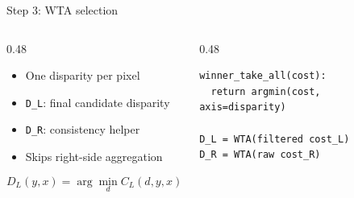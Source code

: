 \documentclass[aspectratio=169,11pt]{beamer}
\newcommand{\code}[1]{\texttt{#1}}
\begin{document}
\begin{frame}[fragile]{Step 3: WTA selection}
\begin{columns}[T,totalwidth=\textwidth]
\begin{column}{0.48\textwidth}
\begin{itemize}
    \item One disparity per pixel
    \item \code{D\_L}: final candidate disparity
    \item \code{D\_R}: consistency helper
    \item Skips right-side aggregation
\end{itemize}
\vspace{0.3em}
\[
D_L(y,x)=\arg\min_d C_L(d,y,x)
\]
\end{column}
\begin{column}{0.48\textwidth}
\scriptsize
\begin{verbatim}
winner_take_all(cost):
  return argmin(cost, axis=disparity)

D_L = WTA(filtered cost_L)
D_R = WTA(raw cost_R)
\end{verbatim}
\end{column}
\end{columns}
\end{frame}



\end{document}
